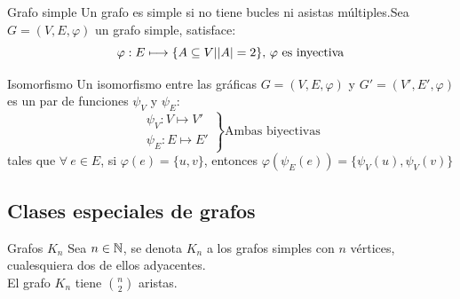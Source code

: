         \begin{definition}{Grafo simple}
            Un grafo es simple si no tiene bucles ni asistas múltiples.\newline Sea $G=(V,E,\varphi)$ un grafo simple, satisface:
            $$\varphi:E\longmapsto\{A\subseteq V|\abs{A}=2\}\text{, $\varphi$ es inyectiva}$$
        \end{definition}
        \begin{definition}{Isomorfismo}
            Un isomorfismo entre las gráficas $G=(V,E,\varphi)$ y $G'=(V',E',\varphi)$
            es un par de funciones $\psi_V$ y $\psi_E$:
            \[
                \left.
                    \begin{array}{c}
                        \psi_V:V\longmapsto V' \\ 
                        \psi_E:E\longmapsto E' 
                    \end{array} 
                \right\} \text{Ambas biyectivas}
            \]
            tales que $\forall\:e\in E$, si $\varphi(e)=\{u,v\}$, entonces $\varphi(\psi_E(e))=\{\psi_V(u),\psi_V(v)\}$
        \end{definition}
    \subsection{Clases especiales de grafos}
        \begin{definition}{Grafos $K_n$}
            Sea $n\in\mathbb{N}$, se denota $K_n$ a los grafos simples con $n$ vértices, cualesquiera dos de ellos adyacentes.\\
            El grafo $K_n$ tiene $\binom{n}{2}$ aristas.
        \end{definition}
        
